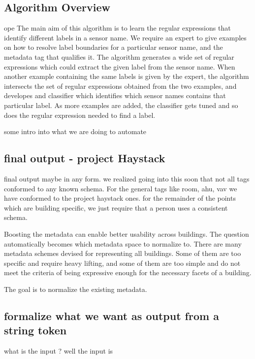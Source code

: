 \subsection{Algorithm Overview}ope
The main aim of this algorithm is to learn the regular expressions that identify different labels in a sensor name. We require an expert to give examples on how to resolve label boundaries for a particular sensor name, and the metadata tag that qualifies it. The algorithm generates a wide set of regular expressions which could extract the given label from the sensor name. When another example containing the same labels is given by the expert, the algorithm intersects the set of regular expressions obtained from the two examples, and developes and classifier which identifies which sensor names contains that particular label. As more examples are added, the classifier gets tuned and so does the regular expression needed to find a label. 

some intro into what we are doing to automate



\subsection{final output - project Haystack}

final output maybe in any form. 
we realized going into this soon that not all tags conformed to any known schema. 
For the general tags like room, ahu, vav we have conformed to the project haystack ones. 
for the remainder of the points which are building specific, we just require that a person uses a consistent schema. 


Boosting the metadata can enable better usability across buildings. The question automatically becomes which metadata space to normalize to. There are many metadata schemes devised for representing all buildings. Some of them are too specific and require heavy lifting, and some of them are too simple and do not meet the criteria of being expressive enough for the necessary facets of a building. 


The goal is to normalize the existing metadata. 

\subsection{ formalize what we want as output from a string token}

what is the input ? 
well the input is 



